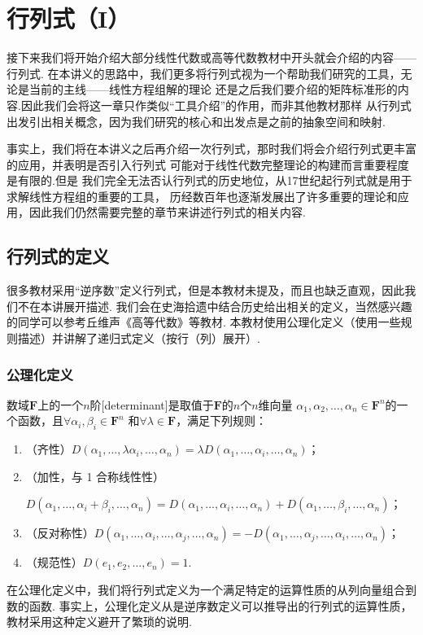 \chapter{行列式（I）}

接下来我们将开始介绍大部分线性代数或高等代数教材中开头就会介绍的内容——行列式.
在本讲义的思路中，我们更多将行列式视为一个帮助我们研究的工具，无论是当前的主线——线性方程组解的理论
还是之后我们要介绍的矩阵标准形的内容.因此我们会将这一章只作类似``工具介绍''的作用，而非其他教材那样
从行列式出发引出相关概念，因为我们研究的核心和出发点是之前的抽象空间和映射.

事实上，我们将在本讲义之后再介绍一次行列式，那时我们将会介绍行列式更丰富的应用，并表明是否引入行列式
可能对于线性代数完整理论的构建而言重要程度是有限的.但是
我们完全无法否认行列式的历史地位，从17世纪起行列式就是用于求解线性方程组的重要的工具，
历经数百年也逐渐发展出了许多重要的理论和应用，因此我们仍然需要完整的章节来讲述行列式的相关内容.

\section{行列式的定义}
很多教材采用``逆序数''定义行列式，但是本教材未提及，而且也缺乏直观，因此我们不在本讲展开描述. 
我们会在史海拾遗中结合历史给出相关的定义，当然感兴趣的同学可以参考丘维声《高等代数》等教材.
本教材使用公理化定义（使用一些规则描述）并讲解了递归式定义（按行（列）展开）.

\subsection{公理化定义}
\begin{definition} \label{def:13:公理化定义}
    数域$\mathbf{F}$上的一个$n$阶[determinant]是取值于$\mathbf{F}$的$n$个$n$维向量
    $\alpha_1,\alpha_2,\ldots,\alpha_n \in \mathbf{F}^n$的一个函数，且$\forall \alpha_i,\beta_i \in \mathbf{F}^n$
    和$\forall \lambda \in \mathbf{F}$，满足下列规则：
    \begin{enumerate}
        \item（齐性）$D(\alpha_1,\ldots,\lambda\alpha_i,\ldots,\alpha_n)=\lambda D(\alpha_1,\ldots,\alpha_i,\ldots,\alpha_n)$；

        \item（加性，与 1 合称线性性）

        $D(\alpha_1,\ldots,\alpha_i+\beta_i,\ldots,\alpha_n)=D(\alpha_1,\ldots,\alpha_i,\ldots,\alpha_n)+D(\alpha_1,\ldots,\beta_i,\ldots,\alpha_n)$；

        \item（反对称性）$D(\alpha_1,\ldots,\alpha_i,\ldots,\alpha_j,\ldots,\alpha_n)=-D(\alpha_1,\ldots,\alpha_j,\ldots,\alpha_i,\ldots,\alpha_n)$；

        \item（规范性）$D(e_1,e_2,\ldots,e_n)=1$.
    \end{enumerate}
\end{definition}
在公理化定义中，我们将行列式定义为一个满足特定的运算性质的从列向量组合到数的函数.
事实上，公理化定义从是逆序数定义可以推导出的行列式的运算性质，教材采用这种定义避开了繁琐的说明.

